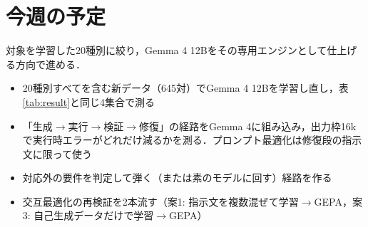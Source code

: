 \documentclass[12pt,a4paper]{article}
\begin{document}
\section{今週の予定}

対象を学習した20種別に絞り，Gemma 4 12Bをその専用エンジンとして仕上げる方向で進める．

\begin{itemize}
  \item 20種別すべてを含む新データ（645対）でGemma 4 12Bを学習し直し，表\ref{tab:result}と同じ4集合で測る
  \item 「生成$\rightarrow$実行$\rightarrow$検証$\rightarrow$修復」の経路をGemma 4に組み込み，出力枠16kで実行時エラーがどれだけ減るかを測る．プロンプト最適化は修復段の指示文に限って使う
  \item 対応外の要件を判定して弾く（または素のモデルに回す）経路を作る
  \item 交互最適化の再検証を2本流す（案1: 指示文を複数混ぜて学習$\rightarrow$GEPA，案3: 自己生成データだけで学習$\rightarrow$GEPA）
\end{itemize}
\end{document}
